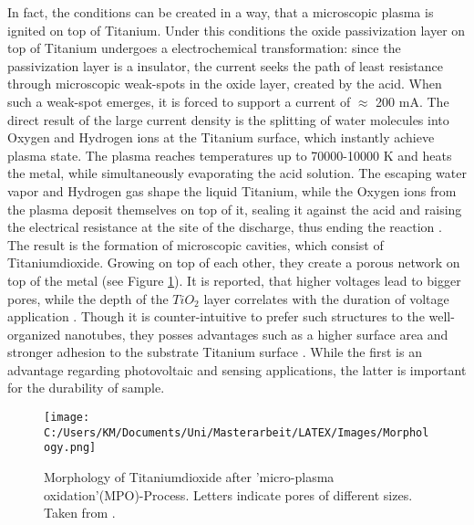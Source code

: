 \documentclass[12pt]{article}
\begin{document}
	In fact, the conditions can be created in a way, that a microscopic plasma is ignited on top of Titanium.	Under this conditions the oxide passivization layer on top of Titanium undergoes a electrochemical transformation: since the passivization layer is a insulator, the current seeks the path of least resistance through microscopic weak-spots in the oxide layer, created by the acid. When such a weak-spot emerges, it is forced to support a current of $\approx$ 200 mA.	The direct result of the large current density is the splitting of water molecules into Oxygen and Hydrogen ions at the Titanium surface, which instantly achieve plasma state. The plasma reaches temperatures up to 70000-10000 K \cite{Achhab} and heats the metal, while simultaneously evaporating the acid solution. The escaping water vapor and Hydrogen gas shape the liquid Titanium, while the Oxygen ions from the plasma deposit themselves on top of it, sealing it against the acid and raising the electrical resistance at the site of the discharge, thus ending the reaction \cite{Achhab}. %
 The result is the formation of microscopic cavities, which consist of Titaniumdioxide. Growing on top of each other, they create a porous network on top of the metal (see Figure \ref{fig:Morphology}). It is reported, that higher voltages lead to bigger pores, while the depth of the $TiO_2$ layer correlates with the duration of voltage application \cite{Achhab, Etching}.%
	Though it is counter-intuitive to prefer such structures to the well-organized nanotubes, they posses advantages such as a higher surface area and stronger adhesion to the substrate Titanium surface \cite{Etching}. While the first is an advantage regarding photovoltaic and sensing applications, the latter is important for the durability of sample.
	

	
\begin{figure}[hbp]
	\centering
		\texttt{[image: C:/Users/KM/Documents/Uni/Masterarbeit/LATEX/Images/Morphology.png]}
	\caption{Morphology of Titaniumdioxide after 'micro-plasma oxidation'(MPO)-Process. Letters indicate pores of different sizes. Taken from \cite{Achhab}.}
	\label{fig:Morphology}
\end{figure}
\end{document}

